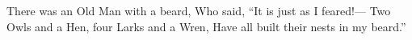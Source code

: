 \documentclass[12pt]{sigbovik-review}
\author{Prof. James McCann}
\begin{document}
\maketitle



There was an Old Man with a beard, \newline
Who said, ``It is just as I feared!—  \newline
Two Owls and a Hen, four Larks and a Wren,  \newline
Have all built their nests in my beard.''
\end{document}
